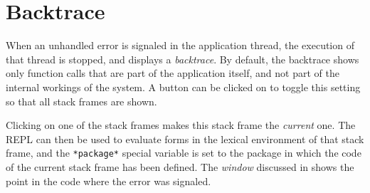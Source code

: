 \chapter{Backtrace}
\label{chap-backtrace}

When an unhandled error is signaled in the application thread, the
execution of that thread is stopped, and \sysname{} displays a
\emph{backtrace}.  By default, the backtrace shows only function calls
that are part of the application itself, and not part of the internal
workings of the \commonlisp{} system.  A button can be clicked on to
toggle this setting so that all stack frames are shown.

Clicking on one of the stack frames makes this stack frame the
\emph{current} one.  The \sysname{} REPL can then be used to evaluate
forms in the lexical environment of that stack frame, and the
\texttt{*package*} special variable is set to the package in which the
code of the current stack frame has been defined.  The
\emph{\stoppingpoint{} window} discussed in
 shows the point in the code where
the error was signaled.
